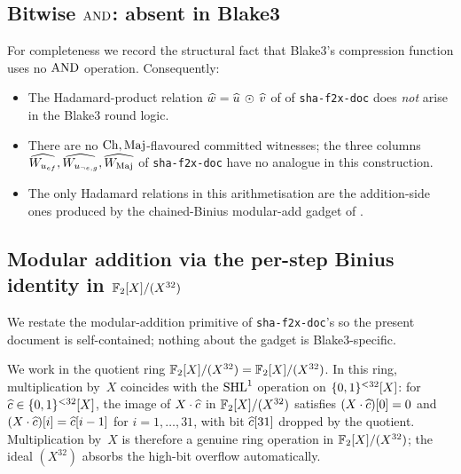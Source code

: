 \subsection{Bitwise $\operatorname{AND}$: absent in Blake3}\label{sec:b3-no-and}

For completeness we record the structural fact that Blake3's
compression function uses no $\operatorname{AND}$ operation. Consequently:
\begin{itemize}[leftmargin=2em,topsep=2pt]
  \item The Hadamard-product relation $\widehat{w} = \widehat{u}\,\odot\,\widehat{v}$
        of  of \texttt{sha-f2x-doc} does
        \emph{not} arise in the Blake3 round logic.
  \item There are no $\operatorname{Ch}, \operatorname{Maj}$-flavoured committed witnesses; the
        three columns $\widehat{W_{u_{ef}}}, \widehat{W_{u_{\neg e, g}}},
        \widehat{W_{\operatorname{Maj}}}$ of \texttt{sha-f2x-doc} have no analogue in
        this construction.
  \item The only Hadamard relations in this arithmetisation are the
        addition-side ones produced by the chained-Binius modular-add
        gadget of .
\end{itemize}

\subsection{Modular addition via the per-step Binius identity in
\texorpdfstring{$\mathbb{F}_2[X]/(X^{32})$}{F2[X]/(X\^{}32)}}\label{sec:b3-mod-add}

We restate the modular-addition primitive of \texttt{sha-f2x-doc}'s
 so the present document is self-contained;
nothing about the gadget is Blake3-specific.

We work in the quotient ring $\mathbb{F}_2[X]/(X^{32}) = \mathbb{F}_2[X]/(X^{32})$. In this
ring, multiplication by~$X$ coincides with the $\operatorname{SHL}^{1}$ operation on
$\{0,1\}^{<32}[X]$: for $\widehat{c} \in \{0,1\}^{<32}[X]$, the image of
$X\cdot\widehat{c}$ in $\mathbb{F}_2[X]/(X^{32})$ satisfies $(X\cdot\widehat{c})[0] = 0$ and
$(X\cdot\widehat{c})[i] = \widehat{c}[i-1]$ for $i = 1,\dots,31$, with bit
$\widehat{c}[31]$ dropped by the quotient. Multiplication by~$X$ is
therefore a genuine ring operation in $\mathbb{F}_2[X]/(X^{32})$; the ideal $(X^{32})$
absorbs the high-bit overflow automatically.

